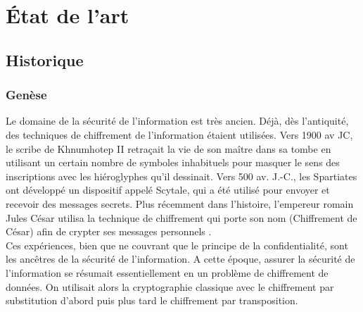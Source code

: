 \chapter{État de l'art}
\minitoc
\clearpage

\section{Historique}

\subsection{Genèse}
Le domaine de la sécurité de l'information est très ancien. Déjà, dès l’antiquité, des techniques de chiffrement de l’information étaient utilisées. Vers 1900 av JC, le scribe de Khnumhotep II retraçait la vie de son maître dans sa tombe en utilisant un certain nombre de symboles inhabituels pour masquer le sens des inscriptions avec les hiéroglyphes qu’il dessinait. Vers 500 av. J.-C., les Spartiates ont développé un dispositif appelé Scytale, qui a été utilisé pour envoyer et recevoir des messages secrets. Plus récemment dans l’histoire, l’empereur romain Jules César utilisa la technique de chiffrement qui porte son nom (Chiffrement de César) afin de crypter ses messages personnels \cite{cours-crypto-mendy}.\\
Ces expériences, bien que ne couvrant que le principe de la confidentialité, sont les ancêtres de la sécurité de l’information. A cette époque, assurer la sécurité de l’information se résumait essentiellement en un problème de chiffrement de données. On utilisait alors la cryptographie classique avec le chiffrement par substitution d’abord  puis plus tard le chiffrement par transposition.

